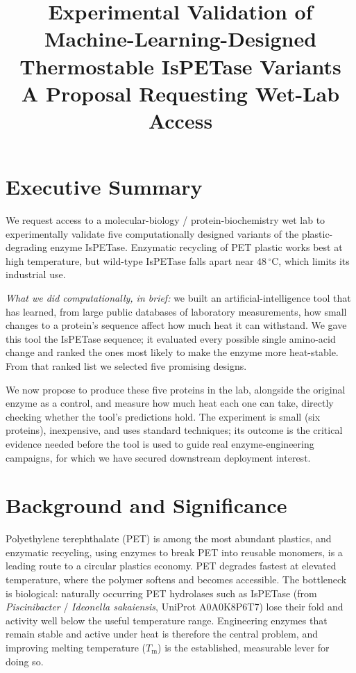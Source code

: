 \documentclass[11pt]{article}
\title{Experimental Validation of Machine-Learning-Designed\\
Thermostable IsPETase Variants\\[0.4em]
{\large A Proposal Requesting Wet-Lab Access}}
\author{}
\date{}
\begin{document}
\maketitle

\section{Executive Summary}
We request access to a molecular-biology / protein-biochemistry wet lab to experimentally
validate five computationally designed variants of the plastic-degrading enzyme IsPETase.
Enzymatic recycling of PET plastic works best at high temperature, but wild-type IsPETase
falls apart near $48\,^{\circ}$C, which limits its industrial use.

\emph{What we did computationally, in brief:} we built an artificial-intelligence tool that has
learned, from large public databases of laboratory measurements, how small changes to a
protein's sequence affect how much heat it can withstand. We gave this tool the IsPETase
sequence; it evaluated every possible single amino-acid change and ranked the ones most likely
to make the enzyme more heat-stable. From that ranked list we selected five promising designs.

We now propose to produce these five proteins in the lab, alongside the original enzyme as a
control, and measure how much heat each one can take, directly checking whether the tool's
predictions hold. The experiment is small (six proteins), inexpensive, and uses standard
techniques; its outcome is the critical evidence needed before the tool is used to guide real
enzyme-engineering campaigns, for which we have secured downstream deployment interest.

\section{Background and Significance}
Polyethylene terephthalate (PET) is among the most abundant plastics, and enzymatic recycling,
using enzymes to break PET into reusable monomers, is a leading route to a circular
plastics economy. PET degrades fastest at elevated temperature, where the polymer softens and
becomes accessible. The bottleneck is biological: naturally occurring PET hydrolases such as
IsPETase (from \emph{Piscinibacter} / \emph{Ideonella sakaiensis}, UniProt A0A0K8P6T7) lose
their fold and activity well below the useful temperature range. Engineering enzymes that
remain stable and active under heat is therefore the central problem, and improving melting
temperature ($T_\mathrm{m}$) is the established, measurable lever for doing so.
\end{document}
